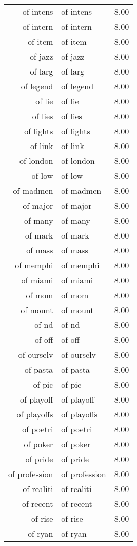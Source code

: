 \begin{table}[ht]
\begin{tabular}{rlr}
  of intens & of intens & 8.00 \\ 
  of intern & of intern & 8.00 \\ 
  of item & of item & 8.00 \\ 
  of jazz & of jazz & 8.00 \\ 
  of larg & of larg & 8.00 \\ 
  of legend & of legend & 8.00 \\ 
  of lie & of lie & 8.00 \\ 
  of lies & of lies & 8.00 \\ 
  of lights & of lights & 8.00 \\ 
  of link & of link & 8.00 \\ 
  of london & of london & 8.00 \\ 
  of low & of low & 8.00 \\ 
  of madmen & of madmen & 8.00 \\ 
  of major & of major & 8.00 \\ 
  of many & of many & 8.00 \\ 
  of mark & of mark & 8.00 \\ 
  of mass & of mass & 8.00 \\ 
  of memphi & of memphi & 8.00 \\ 
  of miami & of miami & 8.00 \\ 
  of mom & of mom & 8.00 \\ 
  of mount & of mount & 8.00 \\ 
  of nd & of nd & 8.00 \\ 
  of off & of off & 8.00 \\ 
  of ourselv & of ourselv & 8.00 \\ 
  of pasta & of pasta & 8.00 \\ 
  of pic & of pic & 8.00 \\ 
  of playoff & of playoff & 8.00 \\ 
  of playoffs & of playoffs & 8.00 \\ 
  of poetri & of poetri & 8.00 \\ 
  of poker & of poker & 8.00 \\ 
  of pride & of pride & 8.00 \\ 
  of profession & of profession & 8.00 \\ 
  of realiti & of realiti & 8.00 \\ 
  of recent & of recent & 8.00 \\ 
  of rise & of rise & 8.00 \\ 
  of ryan & of ryan & 8.00 \\ 

\end{tabular}
\end{table}

